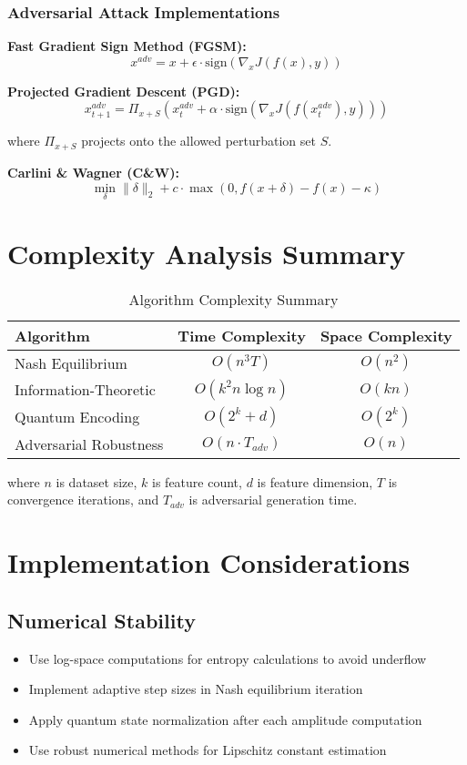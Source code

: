 \documentclass[journal]{IEEEtran}
\begin{document}
\subsubsection{Adversarial Attack Implementations}

\textbf{Fast Gradient Sign Method (FGSM):}
$$x^{adv} = x + \epsilon \cdot \text{sign}(\nabla_x J(f(x), y))$$

\textbf{Projected Gradient Descent (PGD):}
$$x^{adv}_{t+1} = \Pi_{x+S}(x^{adv}_t + \alpha \cdot \text{sign}(\nabla_x J(f(x^{adv}_t), y)))$$

where $\Pi_{x+S}$ projects onto the allowed perturbation set $S$.

\textbf{Carlini \& Wagner (C\&W):}
$$\min_\delta \|\delta\|_2 + c \cdot \max(0, f(x+\delta) - f(x) - \kappa)$$

\section{Complexity Analysis Summary}

\begin{table}[htbp]
\centering
\caption{Algorithm Complexity Summary}
\begin{tabular}{lcc}
\toprule
\textbf{Algorithm} & \textbf{Time Complexity} & \textbf{Space Complexity} \\
\midrule
Nash Equilibrium & $O(n^3 T)$ & $O(n^2)$ \\
Information-Theoretic & $O(k^2 n \log n)$ & $O(kn)$ \\
Quantum Encoding & $O(2^k + d)$ & $O(2^k)$ \\
Adversarial Robustness & $O(n \cdot T_{adv})$ & $O(n)$ \\
\bottomrule
\end{tabular}
\end{table}

where $n$ is dataset size, $k$ is feature count, $d$ is feature dimension, $T$ is convergence iterations, and $T_{adv}$ is adversarial generation time.

\section{Implementation Considerations}

\subsection{Numerical Stability}

\begin{itemize}
\item Use log-space computations for entropy calculations to avoid underflow
\item Implement adaptive step sizes in Nash equilibrium iteration
\item Apply quantum state normalization after each amplitude computation
\item Use robust numerical methods for Lipschitz constant estimation
\end{itemize}
\end{document}
